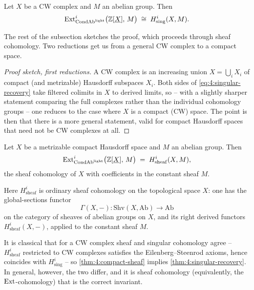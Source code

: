 \begin{theorem}
\label{thm:4:singular-recovery}
Let $X$ be a CW complex and $M$ an abelian group. Then
\begin{equation}
\label{eq:4:singular-recovery}
\operatorname{Ext}^{i}_{\mathrm{CondAb}^{\mathrm{light}}}\bigl(\mathbb{Z}[\underline{X}],\,M\bigr)
\;\cong\;
H^{i}_{\mathrm{sing}}(X,M).
\end{equation}
\end{theorem}

The rest of the subsection sketches the proof, which proceeds through sheaf
cohomology. Two reductions get us from a general CW complex to a compact space.

\begin{proof}[Proof sketch, first reductions]
A CW complex is an increasing union $X=\bigcup_i X_i$ of compact (and metrizable)
Hausdorff subspaces $X_i$. Both sides of \eqref{eq:4:singular-recovery} take
filtered colimits in $X$ to derived limits, so -- with a slightly sharper
statement comparing the full complexes rather than the individual cohomology
groups -- one reduces to the case where $X$ is a compact (CW) space. The point
is then that there is a more general statement, valid for compact Hausdorff
spaces that need not be CW complexes at all.
\end{proof}

\begin{theorem}
\label{thm:4:compact-sheaf}
Let $X$ be a metrizable compact Hausdorff space and $M$ an abelian group. Then
\begin{equation*}
\operatorname{Ext}^{i}_{\mathrm{CondAb}^{\mathrm{light}}}\bigl(\mathbb{Z}[\underline{X}],\,M\bigr)
\;=\;
H^{i}_{\mathrm{sheaf}}(X,M),
\end{equation*}
the sheaf cohomology of $X$ with coefficients in the constant sheaf $M$.
\end{theorem}

Here $H^i_{\mathrm{sheaf}}$ is ordinary sheaf cohomology on the topological space
$X$: one has the global-sections functor
\begin{equation*}
\Gamma(X,-)\colon \mathrm{Shv}(X,\mathrm{Ab})\longrightarrow\mathrm{Ab}
\end{equation*}
on the category of sheaves of abelian groups on $X$, and its right derived
functors $H^i_{\mathrm{sheaf}}(X,-)$, applied to the constant sheaf $M$.

It is classical that for a CW complex sheaf and singular cohomology agree --
$H^i_{\mathrm{sheaf}}$ restricted to CW complexes satisfies the
Eilenberg--Steenrod axioms, hence coincides with $H^i_{\mathrm{sing}}$ -- so
\cref{thm:4:compact-sheaf} implies \cref{thm:4:singular-recovery}. In general,
however, the two differ, and it is sheaf cohomology (equivalently, the
$\operatorname{Ext}$-cohomology) that is the correct invariant.

